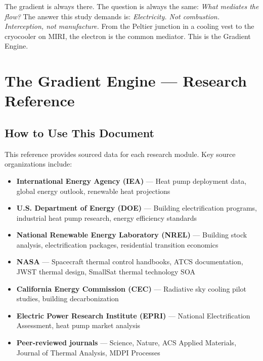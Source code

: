 \documentclass[11pt,letterpaper]{article}
\newcommand{\stageheader}[2]{%
  \noindent\colorbox{#2}{\makebox[\textwidth][l]{%
    \textcolor{white}{\bfseries\sffamily\hspace{6pt}#1\hspace{6pt}}}}%
  \vspace{0.5em}\par%
}
\begin{document}
The gradient is always there. The question is always the same: \textit{What mediates the flow?} The answer this study demands is: \textit{Electricity. Not combustion. Interception, not manufacture.} From the Peltier junction in a cooling vest to the cryocooler on MIRI, the electron is the common mediator. This is the Gradient Engine.

\newpage

\stageheader{STAGE 2 --- RESEARCH REFERENCE}{secondary}

\section{The Gradient Engine --- Research Reference}

\subsection{How to Use This Document}

This reference provides sourced data for each research module. Key source organizations include:

\begin{itemize}[leftmargin=2em]
\item \textbf{International Energy Agency (IEA)} --- Heat pump deployment data, global energy outlook, renewable heat projections
\item \textbf{U.S. Department of Energy (DOE)} --- Building electrification programs, industrial heat pump research, energy efficiency standards
\item \textbf{National Renewable Energy Laboratory (NREL)} --- Building stock analysis, electrification packages, residential transition economics
\item \textbf{NASA} --- Spacecraft thermal control handbooks, ATCS documentation, JWST thermal design, SmallSat thermal technology SOA
\item \textbf{California Energy Commission (CEC)} --- Radiative sky cooling pilot studies, building decarbonization
\item \textbf{Electric Power Research Institute (EPRI)} --- National Electrification Assessment, heat pump market analysis
\item \textbf{Peer-reviewed journals} --- Science, Nature, ACS Applied Materials, Journal of Thermal Analysis, MDPI Processes
\end{itemize}
\end{document}
